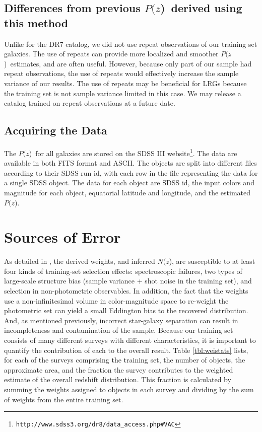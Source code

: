 \documentclass[preprint]{aastex}
\newcommand{\pofz}{$P(z$)}
\newcommand{\nofz}{$N(z$)}
\newcommand{\downloadURL}{{\tt http://www.sdss3.org/dr8/data\_access.php\#VAC}}
\begin{document}
\subsection{Differences from previous \pofz\ derived using this method}

Unlike for the DR7 catalog, we
did not use repeat observations of our training set galaxies.  The use of
repeats can provide more localized and smoother \pofz\ estimates, and are often
useful.  However, because only part of our sample had repeat observations, the
use of repeats would effectively increase the sample variance of our results.
The use of repeats may be beneficial for LRGs because the training set is not
sample variance limited in this case.  We may release a catalog trained on
repeat observations at a future date.  

\subsection{Acquiring the Data} \label{sec:get}

The \pofz\ for all galaxies are stored on the SDSS III
website\footnote{\downloadURL}.  The data are available in both FITS format and
ASCII.  The objects are split into different files according to their SDSS run
id, with each row in the file representing the data for a single SDSS object.
The data for each object are SDSS id, the input colors and magnitude for each
object, equatorial latitude and longitude, and the estimated \pofz.



\section{Sources of Error} \label{sec:errors}

As detailed in \cite{CunhaPhotoz09}, the derived weights, and inferred \nofz,
are susceptible to at least four kinds of training-set selection effects:
spectroscopic failures, two types of large-scale structure bias (sample variance + shot
noise in the training set), and selection in non-photometric observables.  In
addition, the fact that the weights use a non-infinitesimal volume in color-magnitude
space to re-weight the photometric set can yield a small Eddington bias to the
recovered distribution.  And, as mentioned previously, incorrect star-galaxy
separation can result in incompleteness and contamination of the sample.
Because our training set consists of many different surveys with different
characteristics, it is important to quantify the contribution of each to the
overall result.  Table \ref{tbl:weistats} lists, for each of the surveys
comprising the training set, the number of objects, the approximate area, and
the fraction the survey contributes to the weighted estimate of the overall
redshift distribution.  This fraction is calculated by summing the weights
assigned to objects in each survey and dividing by the sum of weights from the
entire training set.
\end{document}
